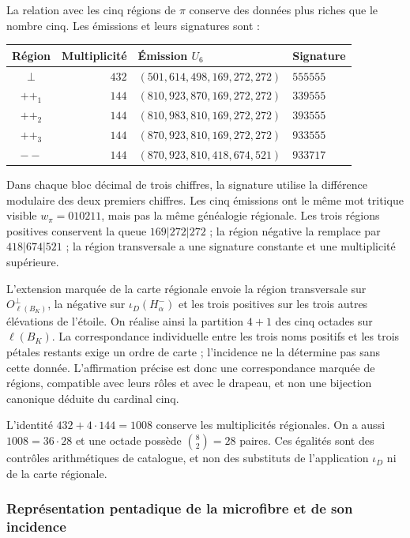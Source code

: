La relation avec les cinq régions de $\pi$ conserve des données plus riches
que le nombre cinq. Les émissions et leurs signatures sont :
\begin{center}
\small
\begin{tabular}{@{}crll@{}}
\toprule
Région & Multiplicité & Émission $U_6$ & Signature \\
\midrule
$\perp$ & $432$ & $(501,614,498,169,272,272)$ & $555555$ \\
$++_1$ & $144$ & $(810,923,870,169,272,272)$ & $339555$ \\
$++_2$ & $144$ & $(810,983,810,169,272,272)$ & $393555$ \\
$++_3$ & $144$ & $(870,923,810,169,272,272)$ & $933555$ \\
$--$ & $144$ & $(870,923,810,418,674,521)$ & $933717$ \\
\bottomrule
\end{tabular}
\end{center}
Dans chaque bloc décimal de trois chiffres, la signature utilise la différence
modulaire des deux premiers chiffres. Les cinq émissions ont le
même mot tritique visible $w_\pi=010211$, mais pas la même
généalogie régionale. Les trois régions positives conservent la queue
$169|272|272$ ; la région négative la remplace par $418|674|521$ ;
la région transversale a une signature constante et une multiplicité supérieure.

L'extension marquée de la carte régionale envoie la région transversale sur $O_{\ell(B_K)}^\perp$, la négative sur $\iota_D(H^-_\alpha)$ et les trois positives sur les trois autres élévations de l'étoile. On réalise ainsi la partition $4+1$ des cinq octades sur $\ell(B_K)$. La correspondance individuelle entre les trois noms positifs et les trois pétales restants exige un ordre de carte ; l'incidence ne la détermine pas sans cette donnée. L'affirmation précise est donc une correspondance marquée de régions, compatible avec leurs rôles et avec le drapeau, et non une bijection canonique déduite du cardinal cinq.

L'identité $432+4\cdot144=1008$ conserve les multiplicités
régionales. On a aussi $1008=36\cdot28$ et une octade possède
$\binom82=28$ paires. Ces égalités sont des contrôles arithmétiques de
catalogue, et non des substituts de l'application $\iota_D$ ni de la carte régionale.


\subsubsection{Représentation pentadique de la microfibre et de son incidence}
\label{x_reciprocidad:pi-estrella:desarrollo}

